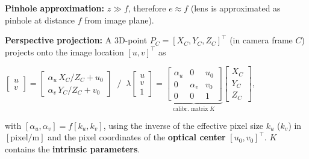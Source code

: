 \documentclass[landscape]{article}
\newcommand{\vmspace}{\vspace{-7pt}}
\newcommand{\vpspace}{\vspace{5pt}}
\begin{document}
\begin{multicols}{3}
\vpspace

\begin{minipage}{\columnwidth}
  \textbf{Pinhole approximation:} $z \gg f$, therefore $e \approx f$ (lens is
  approximated as pinhole at distance $f$ from image plane).
\end{minipage}

\vpspace

\begin{minipage}{\columnwidth}
  \textbf{Perspective projection:} A 3D-point $P_C=[X_C,Y_C,Z_C]^\intercal$ (in
  camera frame $C$) projects
  onto the image location $[u,v]^\intercal$ as
  \vmspace
  \begin{center}
    $\left[\begin{matrix}
      u \\
      v
    \end{matrix}\right]
    =
    \left[\begin{matrix}
      \alpha_u\,X_C/Z_C + u_0 \\
      \alpha_v\,Y_C/Z_C + v_0
    \end{matrix}\right]\;\;/\;\;
    \lambda
    \left[\begin{matrix}
      u \\
      v \\
      1
    \end{matrix}\right]
    =
    \underbrace{\left[\begin{matrix}
      \alpha_u & 0   & u_0 \\
      0   & \alpha_v & v_0 \\
      0   & 0   & 1
    \end{matrix}\right]}_{\text{calibr. matrix}\; K}
    \left[\begin{matrix}
      X_C \\
      Y_C \\
      Z_C
    \end{matrix}\right],
    $
  \end{center}
  \vmspace with $[\alpha_u, \alpha_v] = f [k_u,k_v]$, using the inverse of the
  effective pixel size $k_u$ ($k_v$) in $[\mathrm{pixel}/\mathrm{m}]$ and the
  pixel coordinates of the \textbf{optical center} $[u_0,v_0]^\intercal$. $K$
  contains the \textbf{intrinsic parameters}.
\end{minipage}

\vpspace


\end{multicols}
\end{document}
